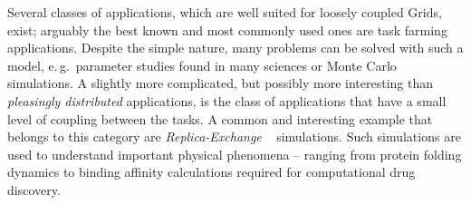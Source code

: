 \documentclass[times, 10pt, twocolumn]{article}
\newcommand{\kimnote}[1]{ {\textcolor{green} { ***JK: #1 }}}
\newcommand{\jhanote}[1]{ {\textcolor{red} { ***SJ: #1 }}}
\newcommand{\kimnote}[1]{}
\newcommand{\jhanote}[1]{}
\newcommand{\up}{\vspace*{-1em}}
\begin{document}
\begin{abstract}
\end{abstract}

\up
{}
                           
\up
Several classes of applications, which are well suited for loosely
coupled Grids, exist; arguably the best known and most commonly used
ones are task farming applications. Despite the simple nature, many
problems can be solved with such a model, e.\,g.\ parameter studies
found in many sciences or Monte Carlo simulations. A slightly more
complicated, but possibly more interesting than {\it pleasingly
  distributed} applications, is the class of applications that have a
small level of coupling between the tasks.
A common and interesting example that belongs to this category are
\emph{Replica-Exchange }~\cite{hansmann,Sugita:1999rm} simulations.
Such simulations are used to understand important physical phenomena
-- ranging from protein folding dynamics to binding affinity
calculations required for computational drug discovery.

  

              
\end{document}
